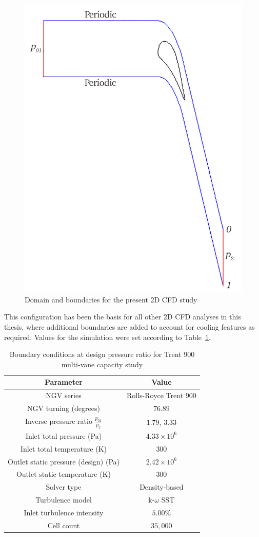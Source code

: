 \documentclass[a4paper, 11pt, oneside]{report}
\begin{document}
\begin{figure}[H]
	\centering
	\includegraphics[width=.6\textwidth]{figs/domain_boundary_conditions.png}
	\caption{Domain and boundaries for the present 2D CFD study}
	\label{fig:computational_domain_and_boundaries}
\end{figure}

This configuration has been the basis for all other 2D CFD analyses in this thesis, where additional boundaries are added to account for cooling features as required. Values for the simulation were set according to Table~\ref{T900_parameters}.

\begin{table}[H]
\caption{Boundary conditions at design pressure ratio for Trent 900 multi-vane capacity study}
\label{T900_parameters}
\begin{center}
\begin{tabular}{|c|c|}
\hline
Parameter & Value\\
\hline
NGV series & Rolls-Royce Trent 900\\
NGV turning (degrees) & $76.89$\\
Inverse pressure ratio $\frac{p_{01}}{p_2}$ & $1.79$, $3.33$\\
Inlet total pressure (Pa) & $4.33 \times 10^6$\\
Inlet total temperature (K) & $300$\\
Outlet static pressure (design) (Pa) & $2.42 \times 10^6$\\
Outlet static temperature (K) & $300$\\
Solver type & Density-based\\
Turbulence model & k-$\omega$ SST\\
Inlet turbulence intensity & $5.00\%$\\
Cell count & $35,000$\\
\hline
\end{tabular}
\end{center}
\end{table}
\end{document}
